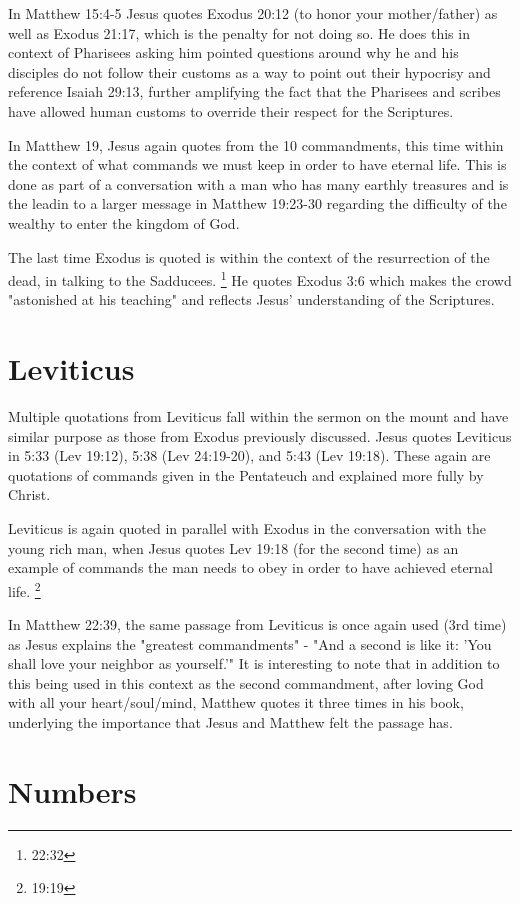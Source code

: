 \documentclass[12pt]{turabian-researchpaper}
\begin{document}
In Matthew 15:4-5 Jesus quotes Exodus 20:12 (to honor your mother/father) as well as Exodus 21:17, which is the penalty for not doing so. He does this in context of Pharisees asking him pointed questions around why he and his disciples do not follow their customs as a way to point out their hypocrisy and reference Isaiah 29:13, further amplifying the fact that the Pharisees and scribes have allowed human customs to override their respect for the Scriptures.

In Matthew 19, Jesus again quotes from the 10 commandments, this time within the context of what commands we must keep in order to have eternal life. This is done as part of a conversation with a man who has many earthly treasures and is the leadin to a larger message in Matthew 19:23-30 regarding the difficulty of the wealthy to enter the kingdom of God.

The last time Exodus is quoted is within the context of the resurrection of the dead, in talking to the Sadducees.
\footnote{22:32} He quotes Exodus 3:6 which makes the crowd "astonished at his teaching" and reflects Jesus' understanding of the Scriptures.

\section{Leviticus}

Multiple quotations from Leviticus fall within the sermon on the mount and have similar purpose as those from Exodus previously discussed. Jesus quotes Leviticus in 5:33 (Lev 19:12), 5:38 (Lev 24:19-20), and 5:43 (Lev 19:18). These again are quotations of commands given in the Pentateuch and explained more fully by Christ.

Leviticus is again quoted in parallel with Exodus in the conversation with the young rich man, when Jesus quotes Lev 19:18 (for the second time) as an example of commands the man needs to obey in order to have achieved eternal life. \footnote{19:19}

In Matthew 22:39, the same passage from Leviticus is once again used (3rd time) as Jesus explains the "greatest commandments" - "And a second is like it: 'You shall love your neighbor as yourself.'" It is interesting to note that in addition to this being used in this context as the second commandment, after loving God with all your heart/soul/mind, Matthew quotes it three times in his book, underlying the importance that Jesus and Matthew felt the passage has.

\section{Numbers}
\end{document}
